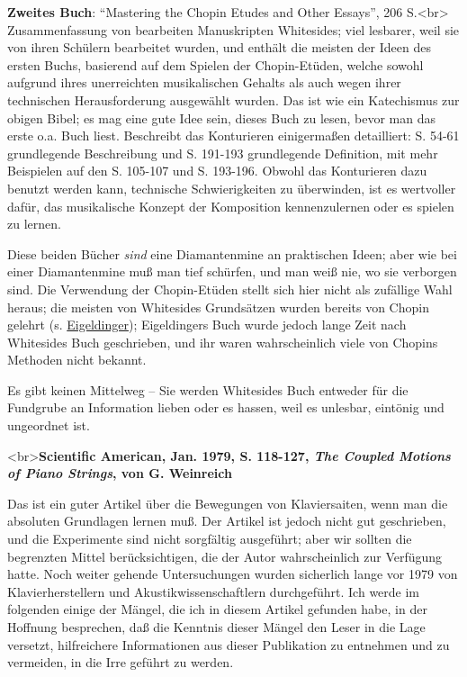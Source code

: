 \textbf{Zweites Buch}: \enquote{Mastering the Chopin Etudes and Other Essays}, 206 S.<br>
Zusammenfassung von bearbeiten Manuskripten Whitesides; viel lesbarer, weil sie von ihren Schülern bearbeitet wurden, und enthält die meisten der Ideen des ersten Buchs, basierend auf dem Spielen der Chopin-Etüden, welche sowohl aufgrund ihres unerreichten musikalischen Gehalts als auch wegen ihrer technischen Herausforderung ausgewählt wurden.
Das ist wie ein Katechismus zur obigen Bibel; es mag eine gute Idee sein, dieses Buch zu lesen, bevor man das erste o.a. Buch liest.
Beschreibt das Konturieren einigermaßen detailliert: S. 54-61 grundlegende Beschreibung und S. 191-193 grundlegende Definition, mit mehr Beispielen auf den S. 105-107 und S. 193-196.
Obwohl das Konturieren dazu benutzt werden kann, technische Schwierigkeiten zu überwinden, ist es wertvoller dafür, das musikalische Konzept der Komposition kennenzulernen oder es spielen zu lernen.

Diese beiden Bücher \textit{sind} eine Diamantenmine an praktischen Ideen; aber wie bei einer Diamantenmine muß man tief schürfen, und man weiß nie, wo sie verborgen sind.
Die Verwendung der Chopin-Etüden stellt sich hier nicht als zufällige Wahl heraus; die meisten von Whitesides Grundsätzen wurden bereits von Chopin gelehrt (s. \hyperref[Eigeldinger]{Eigeldinger}); Eigeldingers Buch wurde jedoch lange Zeit nach Whitesides Buch geschrieben, und ihr waren wahrscheinlich viele von Chopins Methoden nicht bekannt.

Es gibt keinen Mittelweg -- Sie werden Whitesides Buch entweder für die Fundgrube an Information lieben oder es hassen, weil es unlesbar, eintönig und ungeordnet ist.
 

\label{American}

<br>\textbf{Scientific American, Jan. 1979, S. 118-127, \textit{The Coupled Motions of Piano Strings}, von G. Weinreich}

Das ist ein guter Artikel über die Bewegungen von Klaviersaiten, wenn man die absoluten Grundlagen lernen muß.
Der Artikel ist jedoch nicht gut geschrieben, und die Experimente sind nicht sorgfältig ausgeführt; aber wir sollten die begrenzten Mittel berücksichtigen, die der Autor wahrscheinlich zur Verfügung hatte.
Noch weiter gehende Untersuchungen wurden sicherlich lange vor 1979 von Klavierherstellern und Akustikwissenschaftlern durchgeführt.
Ich werde im folgenden einige der Mängel, die ich in diesem Artikel gefunden habe, in der Hoffnung besprechen, daß die Kenntnis dieser Mängel den Leser in die Lage versetzt, hilfreichere Informationen aus dieser Publikation zu entnehmen und zu vermeiden, in die Irre geführt zu werden.

